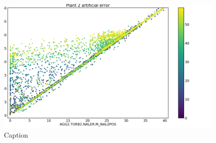         \begin{figure}
            \centering
            \includegraphics[width = \textwidth]{report/figures/analysis/artificial error/plant2_artificial_error_scatter_colored_40.png}
            \caption{Caption}
            \label{fig:plant2_arti_error_40}
        \end{figure}